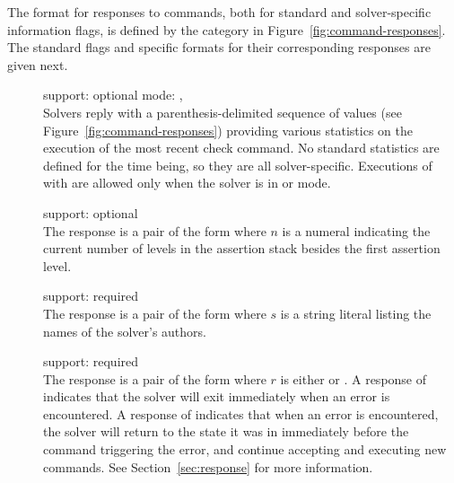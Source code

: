 The format for responses to  commands,
both for standard and solver-specific information flags,
is defined by the  category 
in Figure~\ref{fig:command-responses}.
The standard  flags and specific formats 
for their corresponding responses are given next.  

\begin{description}

\item[] 
\quad support: optional
\quad mode: , 
\\
Solvers reply with a parenthesis-delimited sequence of  
values (see Figure~\ref{fig:command-responses}) providing various statistics 
on the execution of the most recent check command.
No standard statistics are defined for the time being,
so they are all solver-specific.
Executions of  with  are allowed only
when the solver is in  or  mode.

\item[]
\quad support: optional
\\
The response is a pair of the form
where $n$ is a numeral indicating the current number of levels 
in the assertion stack besides the first assertion level.

\item[] 
\quad support: required
\\
The response is a pair of the form
where $s$ is a string literal listing the names of the solver's authors.

\item[]
\quad support: required
\\  
The response is a pair of the form
where $r$ is either  or .
A response of  indicates that the solver
will exit immediately when an error is encountered.  
A response of  indicates that when an error is
encountered, the solver
will return to the state it was in immediately before the command triggering
the error, and continue 
accepting and executing new commands.  
See Section~\ref{sec:response} for more information.


\end{description}
